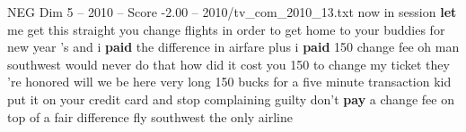 \begin{textsample}{NEG Dim 5 – 2010 – Score -2.00 – 2010/tv\_com\_2010\_13.txt}  \label{ex:f5_neg_025}
now in session \textbf{let} me get this straight you change flights in order to get home to your buddies for new year 's and i \textbf{paid} the difference in airfare plus i \textbf{paid} 150 change fee oh man southwest would never do that how did it cost you 150 to change my ticket they 're honored will we be here very long 150 bucks for a five minute transaction kid put it on your credit card and stop complaining guilty don't \textbf{pay} a change fee on top of a fair difference fly southwest the only airline

\end{textsample}

